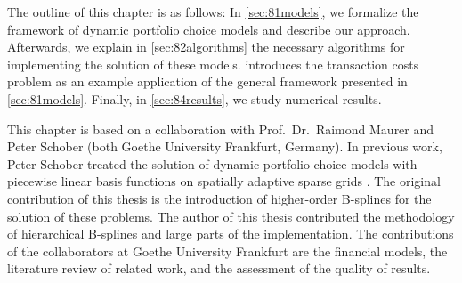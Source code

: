 The outline of this chapter is as follows:
In \cref{sec:81models}, we formalize the framework of
dynamic portfolio choice models and describe our approach.
Afterwards, we explain in \cref{sec:82algorithms} the necessary algorithms
for implementing the solution of these models.
 introduces the transaction costs problem
as an example application of the general framework presented
in \cref{sec:81models}.
Finally, in \cref{sec:84results}, we study numerical results.

This chapter is based on a collaboration with Prof.\ Dr.\ Raimond Maurer
and Peter Schober (both Goethe University Frankfurt, Germany).
In previous work, Peter Schober treated the solution of
dynamic portfolio choice models with piecewise linear basis functions
on spatially adaptive sparse grids \cite{Schober18Solving}.
The original contribution of this thesis is the introduction
of higher-order B-splines for the solution of these problems.
The author of this thesis contributed the methodology of
hierarchical B-splines and large parts of the implementation.
The contributions of the collaborators at Goethe University Frankfurt
are the financial models, the literature review of related work,
and the assessment of the quality of results.






\cleardoublepage

